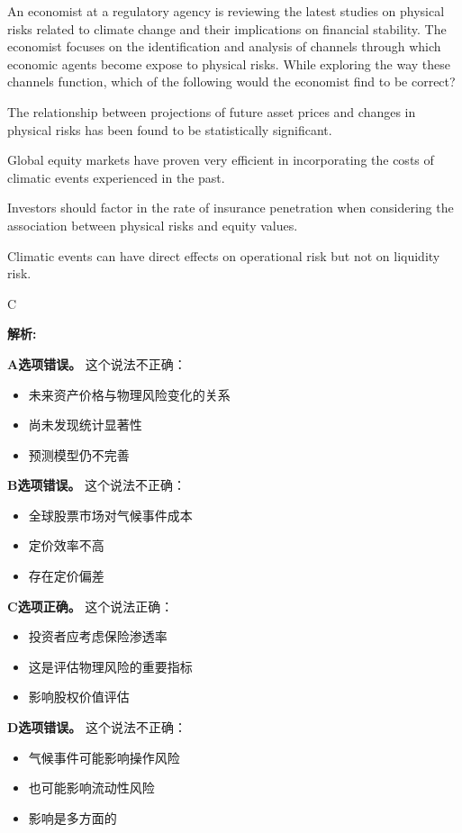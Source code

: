 \documentclass{article}
\newcounter{question} %
\newenvironment{explanation}
{\textbf{解析:}\par}
{\par}
\begin{document}
\begin{question}
    An economist at a regulatory agency is reviewing the latest studies on physical risks related to climate change and their implications on financial stability. The economist focuses on the identification and analysis of channels through which economic agents become expose to physical risks. While exploring the way these channels function, which of the following would the economist find to be correct?
\end{question}

\begin{choices}
    \item The relationship between projections of future asset prices and changes in physical risks has been found to be statistically significant.
    \item Global equity markets have proven very efficient in incorporating the costs of climatic events experienced in the past.
    \item Investors should factor in the rate of insurance penetration when considering the association between physical risks and equity values.
    \item Climatic events can have direct effects on operational risk but not on liquidity risk.
\end{choices}

\begin{correctanswer}
    C
\end{correctanswer}

\begin{explanation}
    \textbf{A选项错误。}
    这个说法不正确：
    \begin{itemize}
        \item 未来资产价格与物理风险变化的关系
        \item 尚未发现统计显著性
        \item 预测模型仍不完善
    \end{itemize}

    \textbf{B选项错误。}
    这个说法不正确：
    \begin{itemize}
        \item 全球股票市场对气候事件成本
        \item 定价效率不高
        \item 存在定价偏差
    \end{itemize}

    \textbf{C选项正确。}
    这个说法正确：
    \begin{itemize}
        \item 投资者应考虑保险渗透率
        \item 这是评估物理风险的重要指标
        \item 影响股权价值评估
    \end{itemize}

    \textbf{D选项错误。}
    这个说法不正确：
    \begin{itemize}
        \item 气候事件可能影响操作风险
        \item 也可能影响流动性风险
        \item 影响是多方面的
    \end{itemize}
\end{explanation}
\end{document}
